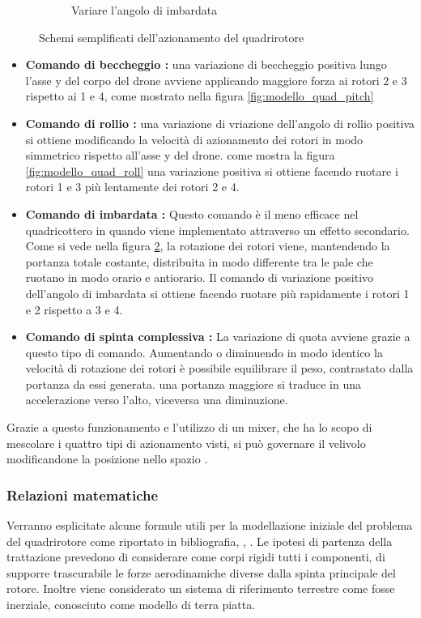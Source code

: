 \begin{figure}
\begin{subfigure}{0.45\textwidth}
		\caption{Variare l'angolo di imbardata}
		\label{fig:modello_quad_yaw}
	\end{subfigure}
	\caption{Schemi semplificati dell'azionamento del quadrirotore}
\end{figure}
\begin{itemize}
	\item \textbf{Comando di beccheggio : } una variazione di beccheggio positiva lungo l'asse y del corpo del drone avviene applicando maggiore forza ai rotori 2 e 3 rispetto ai 1 e 4, come mostrato nella figura \ref{fig:modello_quad_pitch}
	\item \textbf{Comando di rollio : } una variazione di vriazione dell'angolo di rollio positiva si ottiene modificando la velocità di azionamento dei rotori in modo simmetrico rispetto all'asse y del drone. come mostra la figura \ref{fig:modello_quad_roll} una variazione positiva si ottiene facendo ruotare i rotori 1 e 3 più lentamente dei rotori 2 e 4.
	\item \textbf{Comando di imbardata : } Questo comando è il meno efficace nel quadricottero in quando viene implementato attraverso un effetto secondario. Come si vede nella figura \ref{fig:modello_quad_yaw}, la rotazione dei rotori viene, mantendendo la portanza totale costante, distribuita in modo differente tra le pale che ruotano in modo orario e antiorario. Il comando di variazione positivo dell'angolo di imbardata si ottiene facendo ruotare più rapidamente i rotori 1 e 2 rispetto a 3 e 4.
	\item \textbf{Comando di spinta complessiva : } La variazione di quota avviene grazie a questo tipo di comando. Aumentando o diminuendo in modo identico la velocità di rotazione dei rotori è possibile equilibrare il peso, contrastato dalla portanza da essi generata. una portanza maggiore si traduce in una accelerazione verso l'alto, viceversa una diminuzione.
\end{itemize}
Grazie a questo funzionamento e l'utilizzo di un mixer, che ha lo scopo di mescolare i quattro tipi di azionamento visti, si può governare il velivolo modificandone la posizione nello spazio \cite{DesTestCarm}.
\subsubsection{Relazioni matematiche}
Verranno esplicitate alcune formule utili per la modellazione iniziale del problema del quadrirotore come riportato in bibliografia, \cite{DesTestCarm}, \cite{baseTesi}. Le ipotesi di partenza della trattazione prevedono di considerare come corpi rigidi tutti i componenti, di supporre trascurabile le forze aerodinamiche diverse dalla spinta principale del rotore. Inoltre viene considerato un sistema di riferimento terrestre come fosse inerziale, conosciuto come modello di terra piatta.

